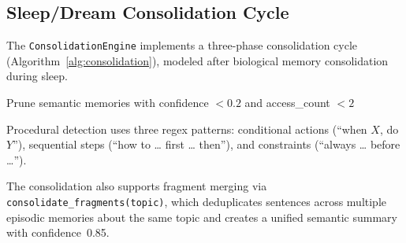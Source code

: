 \documentclass[runningheads]{llncs}
\begin{document}
\subsection{Sleep/Dream Consolidation Cycle}

The \texttt{ConsolidationEngine} implements a three-phase consolidation cycle (Algorithm~\ref{alg:consolidation}), modeled after biological memory consolidation during sleep.

\begin{algorithm}[t]
\caption{Sleep/Dream Consolidation Cycle}\label{alg:consolidation}
\DontPrintSemicolon
{}
\BlankLine
{}
\BlankLine
{}
\BlankLine
{}
Prune semantic memories with confidence $< 0.2$ and access\_count $< 2$\;
\end{algorithm}

Procedural detection uses three regex patterns: conditional actions (``when $X$, do $Y$''), sequential steps (``how to \ldots{} first \ldots{} then''), and constraints (``always \ldots{} before \ldots'').

The consolidation also supports fragment merging via \texttt{consolidate\_frag\-ments(topic)}, which deduplicates sentences across multiple episodic memories about the same topic and creates a unified semantic summary with confidence~0.85.
\end{document}

